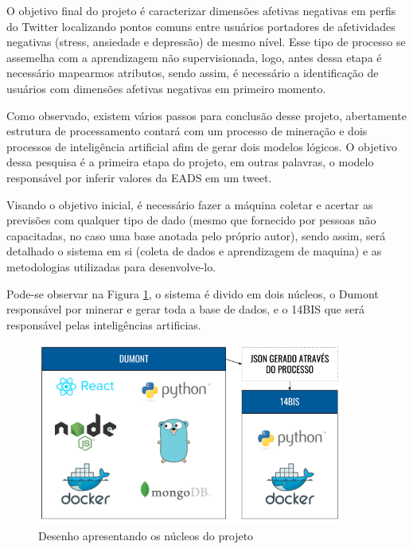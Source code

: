 O objetivo final do projeto é caracterizar dimensões afetivas negativas em perfis do Twitter localizando pontos comuns entre usuários portadores de afetividades negativas (stress, ansiedade e depressão) de mesmo nível. Esse tipo de processo se assemelha com a aprendizagem não supervisionada, logo, antes dessa etapa é necessário mapearmos atributos, sendo assim, é necessário a identificação de usuários com dimensões afetivas negativas em primeiro momento.

Como observado, existem vários passos para conclusão desse projeto, abertamente estrutura de processamento contará com um processo de mineração e dois processos de inteligência artificial afim de gerar dois modelos lógicos. O objetivo dessa pesquisa é a primeira etapa do projeto, em outras palavras, o modelo responsável por inferir valores da EADS em um tweet.

Visando o objetivo inicial, é necessário fazer a máquina coletar e acertar as previsões com qualquer tipo de dado (mesmo que fornecido por pessoas não capacitadas, no caso uma base anotada pelo próprio autor), sendo assim, será detalhado o sistema em si (coleta de dados e aprendizagem de maquina) e as metodologias utilizadas para desenvolve-lo.

Pode-se observar na Figura \ref{fig:tecnologias}, o sistema é divido em dois núcleos, o Dumont responsável por minerar e gerar toda a base de dados, e o 14BIS que será responsável pelas inteligências artificias.

\begin{figure}
    \centering
    \includegraphics[width=0.9\textwidth]{imagens/tecnologias.png}
    \caption{Desenho apresentando os núcleos do projeto}
    \label{fig:tecnologias}
\end{figure}


